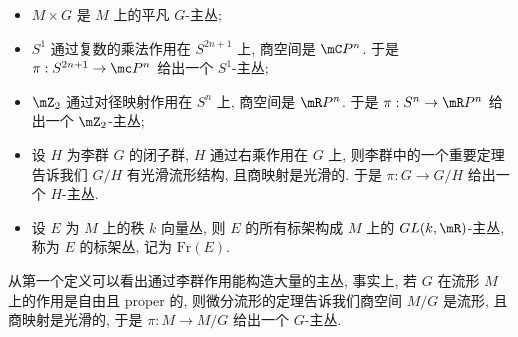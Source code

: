         \begin{example}
            \begin{itemize}
                \item $M\times G$ 是 $M$ 上的平凡 $G$-主丛;
                \item $S^1$ 通过复数的乘法作用在 $S^{2n+1}$ 上, 
                商空间是 $\mC P^n$. 于是 $\pi:S^{2n+1}\rightarrow\mc P^n$ 
                给出一个 $S^1$-主丛;
                \item $\mZ_2$ 通过对径映射作用在 $S^n$ 上,
                商空间是 $\mR P^n$. 于是 $\pi:S^n\rightarrow\mR P^n$ 
                给出一个 $\mZ_2$-主丛;
                \item 设 $H$ 为李群 $G$ 的闭子群, $H$ 通过右乘作用在 $G$ 上, 
                则李群中的一个重要定理告诉我们 $G/H$ 有光滑流形结构,
                且商映射是光滑的. 于是 $\pi:G\rightarrow G/H$ 给出一个 
                $H$-主丛. 
                \item 设 $E$ 为 $M$ 上的秩 $k$ 向量丛, 则 $E$ 的所有标架构成
                $M$ 上的 $GL(k,\mR)$-主丛, 称为 $E$ 的标架丛, 
                记为 $\mathrm{Fr}(E)$. 
            \end{itemize}
        \end{example}
        \begin{remark}
            从第一个定义可以看出通过李群作用能构造大量的主丛, 
            事实上, 若 $G$ 在流形 $M$ 上的作用是自由且 {\rm proper} 的, 
            则微分流形的定理告诉我们商空间 $M/G$ 是流形, 且商映射是光滑的,
            于是 $\pi:M\rightarrow M/G$ 给出一个 $G$-主丛. 
        \end{remark}